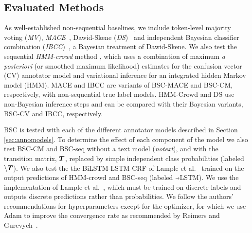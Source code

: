 \subsection{Evaluated Methods}
As well-established non-sequential baselines, we include token-level majority voting (\emph{MV}), \emph{MACE}~\cite{hovy2013learning}, Dawid-Skene (\emph{DS})~\cite{dawid_maximum_1979} and independent Bayesian classifier combination (\emph{IBCC})~\cite{kim2012bayesian}, a Bayesian treatment of Dawid-Skene. 
We also test the sequential \emph{HMM-crowd} method \cite{nguyen2017aggregating}, which uses a combination of 
maximum \emph{a posteriori} (or smoothed maximum likelihood) estimates for the confusion vector (CV) annotator model 
and variational inference for an integrated hidden Markov model (HMM). 
MACE and IBCC are variants of BSC-MACE and BSC-CM, respectively, with non-sequential true label models.
HMM-Crowd and DS use non-Bayesian inference steps and can be compared with
their Bayesian variants, BSC-CV and IBCC, respectively. 

BSC is tested with each of the different annotator models described in Section \ref{sec:annomodels}.
To determine the effect of each component of the model we also test BSC-CM 
and BSC-seq without a text model (\emph{notext}), 
and with the transition matrix, $\boldsymbol T$, replaced by simple independent class probabilities (labeled $\backslash \boldsymbol T$).
We also test the the BiLSTM-LSTM-CRF of Lample et al.~ 
trained on the output predictions of HMM-crowd and BSC-seq (labeled $\Arrow{0.2cm}$LSTM).
We use the implementation of Lample et al.~, which
must be trained on discrete labels and outputs discrete predictions rather than probabilities.
We follow the authors' recommendations for hyperparameters except for the optimizer, 
for which we use Adam to improve the convergence rate as recommended by Reimers and Gurevych~.

